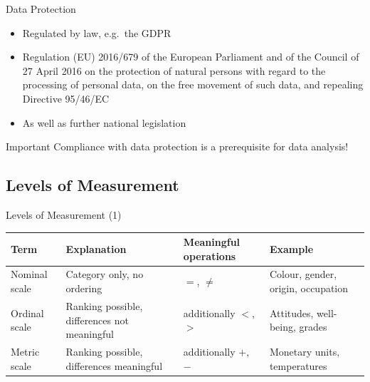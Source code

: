 \documentclass[aspectratio=169,11pt]{beamer}
\begin{document}
\begin{frame}{Data Protection}
  \begin{itemize}
    \item Regulated by law, e.g.\ the GDPR
    \item Regulation (EU) 2016/679 of the European Parliament and of the Council of 27 April 2016 on the protection of natural persons with regard to the processing of personal data, on the free movement of such data, and repealing Directive 95/46/EC
    \item As well as further national legislation
  \end{itemize}

  \bigskip

  \begin{alertblock}{Important}
    Compliance with data protection is a prerequisite for data analysis!
  \end{alertblock}
\end{frame}

\subsection{Levels of Measurement}

\begin{frame}{Levels of Measurement (1)}
  \begin{center}
    \small\renewcommand{\arraystretch}{1.3}
    \begin{tabular}{l>{\raggedright\arraybackslash}p{3.9cm}>{\raggedright\arraybackslash}p{3.0cm}>{\raggedright\arraybackslash}p{3.9cm}}
      \toprule
      \textbf{Term} & \textbf{Explanation} & \textbf{Meaningful operations} & \textbf{Example} \\
      \midrule
      Nominal scale & Category only, no ordering & $=$, $\neq$ & Colour, gender, origin, occupation \\
      Ordinal scale & Ranking possible, differences not meaningful & additionally $<$, $>$ & Attitudes, well-being, grades \\
      Metric scale & Ranking possible, differences meaningful & additionally $+$, $-$ & Monetary units, temperatures \\
      \bottomrule
    \end{tabular}
  \end{center}
  \vspace{0.3cm}
\end{frame}
\end{document}
